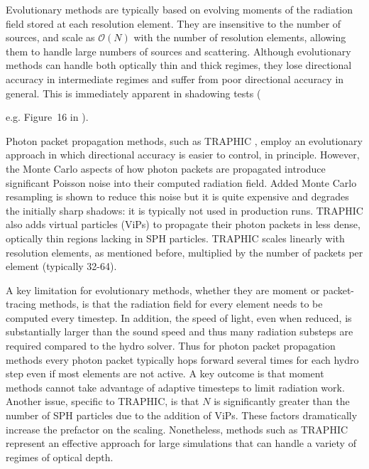 \documentclass[fleq,usenatbib]{mnras}
\begin{document}
Evolutionary methods are typically based on evolving moments of the radiation 
field stored at each resolution element. They are insensitive to the number of 
sources, and scale as $\mathcal{O}(N)$ with the number of resolution elements, 
allowing them to handle large numbers of sources and scattering. Although 
evolutionary methods can handle both optically thin and thick regimes, they 
lose directional accuracy in intermediate regimes and suffer from poor 
directional accuracy in general. This is immediately apparent in shadowing 
tests ({e.g. Figure~16 in \citealt{rosdahlEt13}).

Photon packet propagation methods, such as TRAPHIC \citep{pawlikSchaye08}, 
employ an evolutionary approach in which directional accuracy is easier to 
control, in principle. However, the Monte Carlo aspects of how photon packets 
are propagated introduce significant Poisson noise into their computed 
radiation field. Added Monte Carlo resampling is shown to reduce this noise 
but it is quite expensive and degrades the initially sharp shadows: it is 
typically not used in production runs. TRAPHIC also adds virtual particles 
(ViPs) to propagate their photon packets in less dense, optically thin regions 
lacking in SPH particles. TRAPHIC scales linearly with resolution elements, as 
mentioned before, multiplied by the number of packets per element (typically 
32-64).

A key limitation for evolutionary methods, whether they are moment or 
packet-tracing methods, is that the radiation field for every element needs to 
be computed every timestep. In addition, the speed of light, even when 
reduced, is substantially larger than the sound speed and thus many radiation 
substeps are required compared to the hydro solver. Thus for photon packet 
propagation methods every photon packet typically hops forward several times 
for each hydro step even if most elements are not active. A key outcome is 
that moment methods cannot take advantage of adaptive timesteps to limit 
radiation work.  Another issue, specific to TRAPHIC, is that $N$ is 
significantly greater than the number of SPH particles due to the addition of 
ViPs. These factors dramatically increase the prefactor on the scaling.  
Nonetheless, methods such as TRAPHIC represent an effective approach for large 
simulations that can handle a variety of regimes of optical depth.

}
\end{document}
